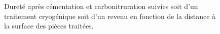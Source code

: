 \begin{figure}[h]
  \centering
  \hfill
  
  \caption{\label{fig:hardness_temper}Dureté après cémentation et carbonitruration suivies soit d'un traitement cryogénique soit d'un revenu en fonction de la distance à la surface des pièces traitées.}
\end{figure}

